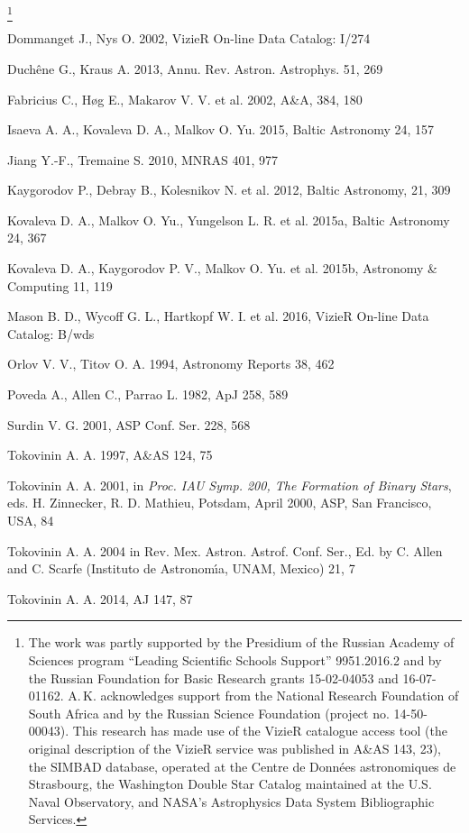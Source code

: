 \documentclass[10pt,a4paper,twoside]{article}
\begin{document}
\thanks{
The work was partly supported by the Presidium of the Russian
Academy of Sciences program ``Leading Scientific Schools Support''
9951.2016.2 and by the Russian Foundation for Basic Research
grants 15-02-04053 and 16-07-01162.
A.\,K. acknowledges support from the National Research Foundation
of South Africa and by the Russian Science Foundation (project no.
14-50-00043). This research has made use of the VizieR catalogue
access tool (the original description of the VizieR service was
published in A\&AS 143, 23), the SIMBAD database, operated at the
Centre de Donn\'ees astronomiques de Strasbourg, the Washington
Double Star Catalog maintained at the U.S. Naval Observatory, and
NASA's Astrophysics Data System Bibliographic Services. }

\References

 Dommanget J., Nys O. 2002, VizieR On-line Data Catalog: I/274

 Duch\^ene G., Kraus A. 2013, Annu. Rev. Astron. Astrophys.
51, 269

 Fabricius C., H{\o}g E., Makarov V. V. et al. 2002, A\&A, 384, 180

 Isaeva A. A., Kovaleva D. A., Malkov O. Yu. 2015, Baltic
Astronomy 24, 157

 Jiang Y.-F., Tremaine S. 2010, MNRAS 401, 977

 Kaygorodov P., Debray B., Kolesnikov N. et al. 2012, Baltic Astronomy, 21, 309

 Kovaleva D. A., Malkov O. Yu., Yungelson L. R. et al. 2015a,
Baltic Astronomy 24, 367

 Kovaleva D. A., Kaygorodov P. V., Malkov O. Yu. et al.
2015b, Astronomy \& Computing 11, 119

 Mason B. D., Wycoff G. L., Hartkopf W. I. et al. 2016, VizieR On-line Data Catalog: B/wds

 Orlov V. V., Titov O. A. 1994, Astronomy Reports 38, 462

 Poveda A., Allen C., Parrao L. 1982, ApJ 258, 589

 Surdin V. G. 2001, ASP Conf. Ser. 228, 568

 Tokovinin A. A. 1997, A\&AS 124, 75

 Tokovinin A. A. 2001, in {\em Proc. IAU Symp. 200, The
Formation of Binary Stars}, eds. H. Zinnecker, R. D. Mathieu,
Potsdam, April 2000, ASP, San Francisco, USA, 84

 Tokovinin A. A. 2004 in Rev. Mex. Astron. Astrof. Conf.
Ser., Ed. by C. Allen and C. Scarfe (Instituto de Astronom\'\i a,
UNAM, Mexico) 21, 7

 Tokovinin A. A. 2014, AJ 147, 87
\end{document}
